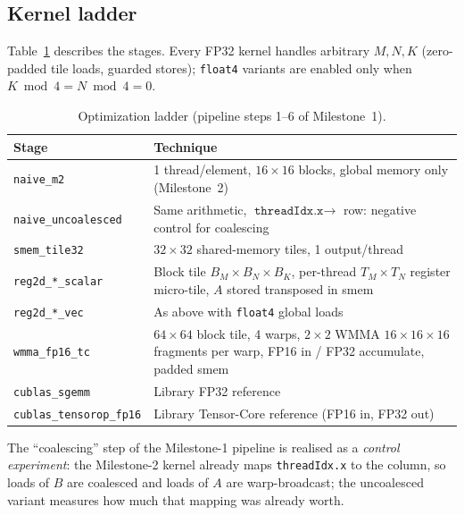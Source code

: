 \documentclass[conference]{IEEEtran}
\begin{document}
\subsection{Kernel ladder}
Table~\ref{tab:ladder} describes the stages. Every FP32 kernel handles arbitrary $M,N,K$ (zero-padded tile loads, guarded stores); \texttt{float4} variants are enabled only when $K\bmod4=N\bmod4=0$.
\begin{table}[t]
\caption{Optimization ladder (pipeline steps 1--6 of Milestone~1).}\label{tab:ladder}
\centering\scriptsize\setlength{\tabcolsep}{2.5pt}
\begin{tabular}{lp{5.4cm}}
\hline
Stage & Technique \\ \hline
\texttt{naive\_m2} & 1 thread/element, $16{\times}16$ blocks, global memory only (Milestone~2) \\
\texttt{naive\_uncoalesced} & Same arithmetic, $\texttt{threadIdx.x}\to$ row: negative control for coalescing \\
\texttt{smem\_tile32} & $32{\times}32$ shared-memory tiles, 1 output/thread \\
\texttt{reg2d\_*\_scalar} & Block tile $B_M{\times}B_N{\times}B_K$, per-thread $T_M{\times}T_N$ register micro-tile, $A$ stored transposed in smem \\
\texttt{reg2d\_*\_vec} & As above with \texttt{float4} global loads \\
\texttt{wmma\_fp16\_tc} & $64{\times}64$ block tile, 4 warps, $2{\times}2$ WMMA $16{\times}16{\times}16$ fragments per warp, FP16 in / FP32 accumulate, padded smem \\
\texttt{cublas\_sgemm} & Library FP32 reference \\
\texttt{cublas\_tensorop\_fp16} & Library Tensor-Core reference (FP16 in, FP32 out) \\ \hline
\end{tabular}
\end{table}
The ``coalescing'' step of the Milestone-1 pipeline is realised as a \emph{control experiment}: the Milestone-2 kernel already maps \texttt{threadIdx.x} to the column, so loads of $B$ are coalesced and loads of $A$ are warp-broadcast; the uncoalesced variant measures how much that mapping was already worth.
\end{document}
